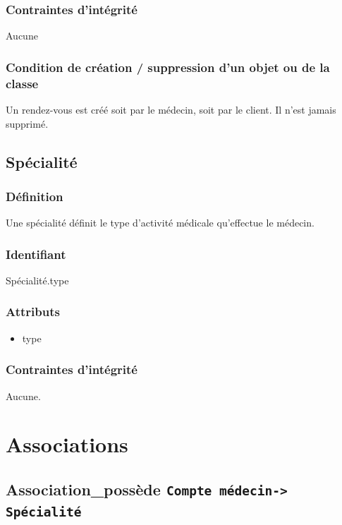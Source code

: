 \subsubsection{Contraintes d'intégrité}

Aucune

\subsubsection{Condition de création / suppression d'un objet ou de la classe}

Un rendez-vous est créé soit par le médecin, soit par le client. Il n'est jamais supprimé.

\subsection{Spécialité}

\subsubsection{Définition}

Une spécialité définit le type d'activité médicale qu'effectue le médecin.

\subsubsection{Identifiant}

Spécialité.type

\subsubsection{Attributs}

\begin{itemize}
    \item type
\end{itemize}

\subsubsection{Contraintes d'intégrité}

Aucune.

\newpage
\section{Associations}

\subsection{Association\_possède \texttt{Compte médecin-> Spécialité}}
